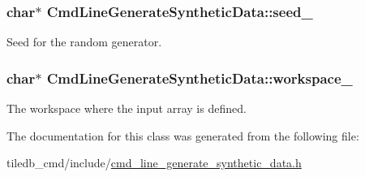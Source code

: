 \subsubsection[{seed\+\_\+}]{\setlength{\rightskip}{0pt plus 5cm}char$\ast$ Cmd\+Line\+Generate\+Synthetic\+Data\+::seed\+\_\+}\label{classCmdLineGenerateSyntheticData_ac19336308c1a0903967dd13fd231e7ab}
Seed for the random generator. \hypertarget{classCmdLineGenerateSyntheticData_a7ecfa9e1242ed4b2cd1f5c1bc4cf8ae5}{}
\subsubsection[{workspace\+\_\+}]{\setlength{\rightskip}{0pt plus 5cm}char$\ast$ Cmd\+Line\+Generate\+Synthetic\+Data\+::workspace\+\_\+}\label{classCmdLineGenerateSyntheticData_a7ecfa9e1242ed4b2cd1f5c1bc4cf8ae5}
The workspace where the input array is defined. 

The documentation for this class was generated from the following file\+:\begin{DoxyCompactItemize}
\item 
tiledb\+\_\+cmd/include/\hyperlink{cmd__line__generate__synthetic__data_8h}{cmd\+\_\+line\+\_\+generate\+\_\+synthetic\+\_\+data.\+h}\end{DoxyCompactItemize}
